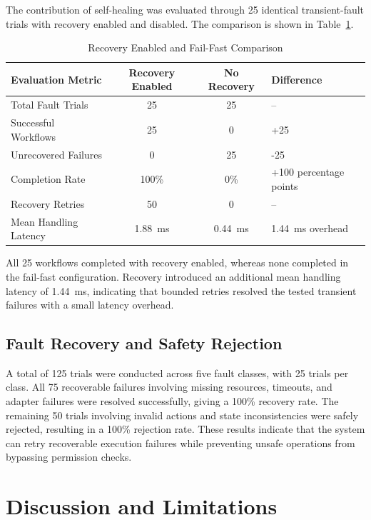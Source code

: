 \documentclass[conference]{IEEEtran}
\begin{document}
The contribution of self-healing was evaluated through 25 identical
transient-fault trials with recovery enabled and disabled. The
comparison is shown in Table~\ref{tab:recovery_comparison}.

\begin{table}[t]
\centering
\caption{Recovery Enabled and Fail-Fast Comparison}
\label{tab:recovery_comparison}
\begin{tabular}{|p{4.0cm}|c|c|p{3.0cm}|}
\hline
\textbf{Evaluation Metric} &
\textbf{Recovery Enabled} &
\textbf{No Recovery} &
\textbf{Difference} \\
\hline
Total Fault Trials & 25 & 25 & -- \\
\hline
Successful Workflows & 25 & 0 & +25 \\
\hline
Unrecovered Failures & 0 & 25 & -25 \\
\hline
Completion Rate & 100\% & 0\% & +100 percentage points \\
\hline
Recovery Retries & 50 & 0 & -- \\
\hline
Mean Handling Latency & 1.88~ms & 0.44~ms & 1.44~ms overhead \\
\hline
\end{tabular}
\end{table}

All 25 workflows completed with recovery enabled, whereas none
completed in the fail-fast configuration. Recovery introduced an
additional mean handling latency of 1.44~ms, indicating that bounded
retries resolved the tested transient failures with a small latency
overhead.

\subsection{Fault Recovery and Safety Rejection}

A total of 125 trials were conducted across five fault classes, with
25 trials per class. All 75 recoverable failures involving missing
resources, timeouts, and adapter failures were resolved successfully,
giving a 100\% recovery rate. The remaining 50 trials involving
invalid actions and state inconsistencies were safely rejected,
resulting in a 100\% rejection rate. These results indicate that the
system can retry recoverable execution failures while preventing
unsafe operations from bypassing permission checks.

\section{Discussion and Limitations}
\end{document}
